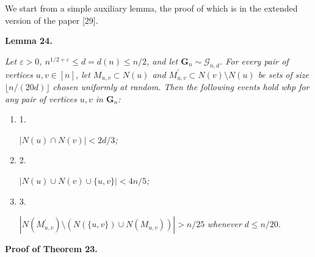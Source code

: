 \documentclass[10pt,a4paper]{article}
\begin{document}



We start from a simple auxiliary lemma, the proof of which is in the extended version of the paper [29].\par





\par\medskip\noindent\textbf{
\textbf{Lemma 24}\textbf{.}
}\par



\emph{Let $\varepsilon>0$, $n^{1/2+\varepsilon}\leq d=d(n)\leq n/2$, and let $\mathbf{G}_{n}\sim\mathcal{G}_{n,d}$.
For every pair of vertices $u,v\in[n]$, let $M_{u,v}\subset N(u)$ and $M^{\prime}_{u,v}\subset N(v)\setminus N(u)$ be sets of size $\lfloor n/(20d)\rfloor$ chosen uniformly at random. Then the following events hold whp for any pair of vertices $u,v$ in $\mathbf{G}_{n}$:}\par


\begin{enumerate}


\item[] 
1. 


$|N(u)\cap N(v)|<2d/3$\emph{;}\par





\item[] 
2. 


$|N(u)\cup N(v)\cup\{u,v\}|<4n/5$\emph{;}\par





\item[] 
3. 


$|N(M^{\prime}_{u,v})\setminus(N(\{u,v\})\cup N(M_{u,v}))|>n/25$\emph{ whenever }$d\leq n/20$\emph{.}\par





\end{enumerate}






\par\medskip\noindent\textbf{Proof of Theorem 23.}\par
\end{document}

